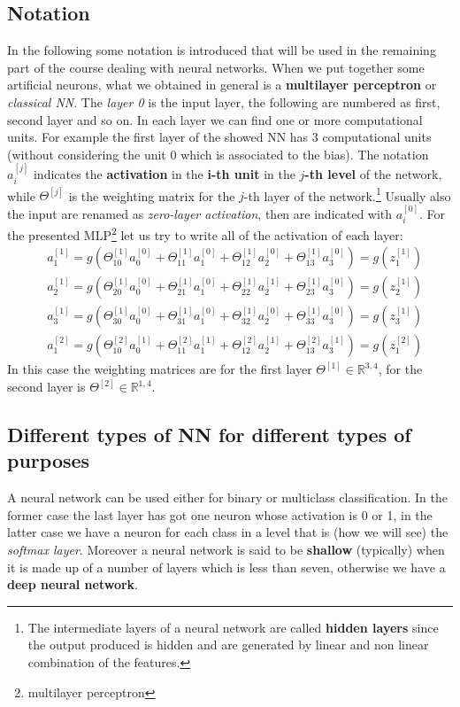 \subsection{Notation} 
In the following some notation is introduced that will be used in the remaining part of the course dealing with neural networks. When we put together some artificial neurons, what we obtained in general is a \textbf{multilayer perceptron} or \textit{classical NN}. The \textit{layer 0} is the input layer, the following are numbered as first, second layer and so on. In each layer we can find one or more computational units. For example the first layer of the showed NN has 3 computational units (without considering the unit 0 which is associated to the bias). The notation $a_i^{[j]}$ indicates the \textbf{activation} in the \textbf{i-th unit} in the \textbf{$j$-th level} of the network, while $\Theta^{[j]}$ is the weighting matrix for the  $j$-th layer of the network.\footnote{
    The intermediate layers of a neural network are called \textbf{hidden layers} since the output produced is hidden and are generated by linear and non linear combination of the features.
}
Usually also the input are renamed as \textit {zero-layer activation}, then are indicated with $a_i^{[0]}$. For the presented MLP\footnote{
    multilayer perceptron
} let us try to write all of the activation of each layer:
\begin{align*}
    &a_1^{[1]} = g(\Theta_{10}^{[1]} a_0^{[0]} + \Theta_{11}^{[1]} a_1^{[0]}+\Theta_{12}^{[1]}a_2^{[0]}+\Theta_{13}^{[1]}a_3^{[0]})=g(z_1^{[1]})\\
    &a_2^{[1]} = g(\Theta_{20}^{[1]} a_0^{[0]} + \Theta_{21}^{[1]} a_1^{[0]}+\Theta_{22}^{[1]}a_2^{[1]}+\Theta_{23}^{[1]}a_3^{[0]})=g(z_2^{[1]})\\
    &a_3^{[1]} = g(\Theta_{30}^{[1]} a_0^{[0]} + \Theta_{31}^{[1]} a_1^{[0]}+\Theta_{32}^{[1]}a_2^{[0]}+\Theta_{33}^{[1]}a_3^{[0]})=g(z_3^{[1]})\\
    &a_1^{[2]} = g(
        \Theta_{10}^{[2]}a_0^{[1]}+
        \Theta_{11}^{[2]}a_1^{[1]}+
        \Theta_{12}^{[2]}a_2^{[1]}+
        \Theta_{13}^{[2]}a_3^{[1]} 
    )=g(z_1^{[2]})
\end{align*}
\noindent
In this case the weighting matrices are for the first layer $\Theta^{[1]}\in\mathbb{R}^{3,4}$, for the second layer is $\Theta^{[2]}\in\mathbb{R}^{1,4}$.

\subsection{Different types of NN for different types of purposes}
A neural network can be used either for binary or multiclass classification. In the former case the last layer has got one neuron whose activation is 0 or 1, in the latter case we have a neuron for each class in a level that is (how we will see) the \textit{softmax layer}. Moreover a neural network is said to be \textbf{shallow} (typically) when it is made up of a number of layers which is less than seven, otherwise we have a \textbf{deep neural network}.

